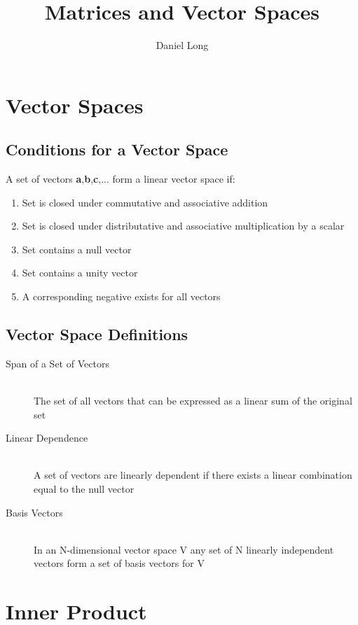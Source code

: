 \documentclass{article}
\title{Matrices and Vector Spaces}
\author{Daniel Long}
\begin{document}
\maketitle
  
\tableofcontents

\section{Vector Spaces}

\subsection{Conditions for a Vector Space}

A set of vectors \textbf{a},\textbf{b},\textbf{c},... form a linear vector space if:

\renewcommand{\theenumi}{\roman{enumi}}
\begin{enumerate}
\item Set is closed under commutative and associative addition
\item Set is closed under distributative and associative multiplication by a scalar
\item Set contains a null vector
\item Set contains a unity vector
\item A corresponding negative exists for all vectors
\end{enumerate}

\subsection{Vector Space Definitions}

\begin{description}
  \item[Span of a Set of Vectors] \hfill \\ The set of all vectors that can be expressed as a linear sum of the original set
  \item[Linear Dependence] \hfill \\ A set of vectors are linearly dependent if there exists a linear combination equal to the null vector
  \item[Basis Vectors] \hfill \\ In an N-dimensional vector space V any set of N linearly independent vectors form a set of basis vectors for V
\end{description}

\section{Inner Product}
\end{document}
